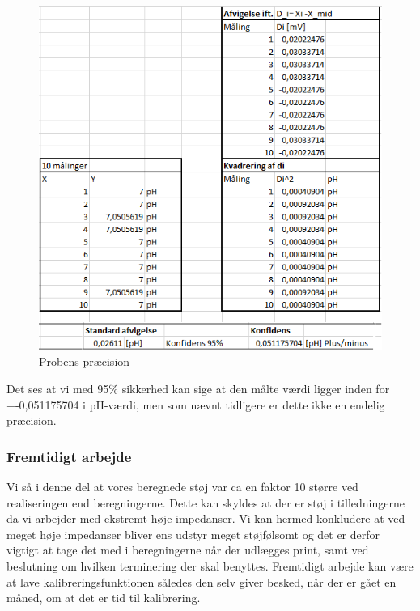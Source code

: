  \begin{figure}[H]
	\centering 
	\includegraphics[scale=1]{HardwareArkitektur/Sensore/pH_probe_billeder/Probe_afvigelse.PNG}
	\caption{Probens præcision}
	\label{photo:probe_afvigelse}
\end{figure} 

Det ses at vi med 95\% sikkerhed kan sige at den målte værdi ligger inden for +-0,051175704 i pH-værdi, men som nævnt tidligere er dette ikke en endelig præcision.    

\subsubsection{Fremtidigt arbejde}
Vi så i denne del at vores beregnede støj var ca en faktor 10 større ved realiseringen end beregningerne. Dette kan skyldes at der er støj i tilledningerne da vi arbejder med ekstremt høje impedanser. Vi kan hermed konkludere at ved meget høje impedanser bliver ens udstyr meget støjfølsomt og det er derfor vigtigt at tage det med i beregningerne når der udlægges print, samt ved beslutning om hvilken terminering der skal benyttes. Fremtidigt arbejde kan være at lave kalibreringsfunktionen således den selv giver besked, når der er gået en måned, om at det er tid til kalibrering. 



